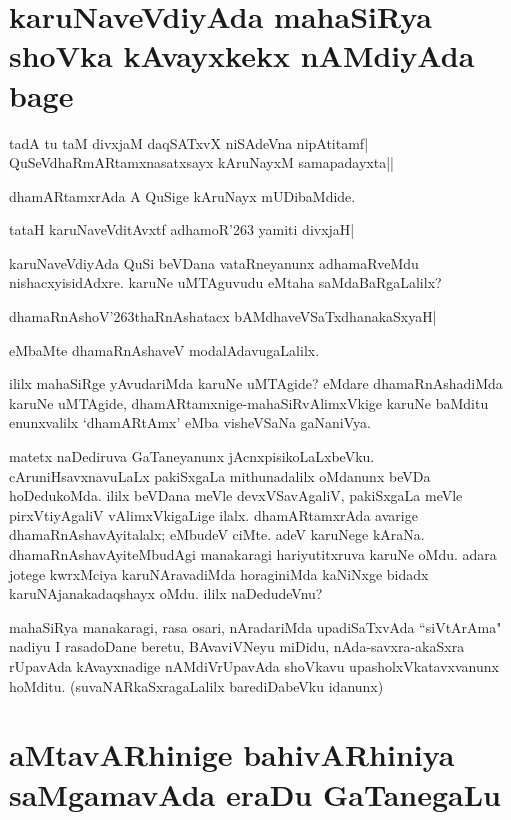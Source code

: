 \section*{karuNaveVdiyAda mahaSiRya shoVka kAvayxkekx nAMdiyAda bage} 

\begin{shloka} 
tadA tu taM divxjaM daqSATxvX niSAdeVna nipAtitamf|\label{199}\\ 
QuSeVdhaRmARtamxnasatxsayx kAruNayxM samapadayxta|| 
\end{shloka}

dhamARtamxrAda A QuSige kAruNayx mUDibaMdide. 

\begin{shloka} 
tataH karuNaveVditAvxtf adhamoR\char'263 yamiti divxjaH| 
\end{shloka}

karuNaveVdiyAda QuSi beVDana vataRneyanunx adhamaRveMdu nishacxyisidAdxre. karuNe uMTAguvudu eMtaha saMdaBaRgaLalilx? 

\begin{shloka}
dhamaRnAshoV\char'263thaRnAshatacx bAMdhaveVSaTxdhanakaSxyaH|\label{199a}
\end{shloka}
eMbaMte dhamaRnAshaveV modalAdavugaLalilx. 

ililx mahaSiRge yAvudariMda karuNe uMTAgide? eMdare dhamaRnAshadiMda karuNe uMTAgide, dhamARtamxnige-mahaSiRvAlimxVkige karuNe baMditu enunxvalilx `dhamARtAmx' eMba visheVSaNa gaNaniVya. 

matetx naDediruva GaTaneyanunx jAcnxpisikoLaLxbeVku. cAruniHsavxnavuLaLx pakiSxgaLa mithunadalilx oMdanunx beVDa hoDedukoMda. ililx beVDana meVle devxVSavAgaliV, pakiSxgaLa meVle pirxVtiyAgaliV vAlimxVkigaLige ilalx. dhamARtamxrAda avarige dhamaRnAshavAyitalalx; eMbudeV ciMte. adeV karuNege kAraNa. dhamaRnAshavAyiteMbudAgi manakaragi hariyutitxruva karuNe oMdu. adara jotege kwrxMciya karuNAravadiMda horaginiMda kaNiNxge bidadx karuNAjanakadaqshayx oMdu. ililx naDedudeVnu? 

mahaSiRya manakaragi, rasa osari, nAradariMda upadiSaTxvAda ``siVtArAma" nadiyu I rasadoDane beretu, BAvaviVNeyu miDidu, nAda-savxra-akaSxra rUpavAda kAvayxnadige nAMdiVrUpavAda shoVkavu upasholxVkatavxvanunx hoMditu. (suvaNARkaSxragaLalilx barediDabeVku idanunx) 

\section*{aMtavARhinige bahivARhiniya saMgamavAda eraDu GaTanegaLu} 

